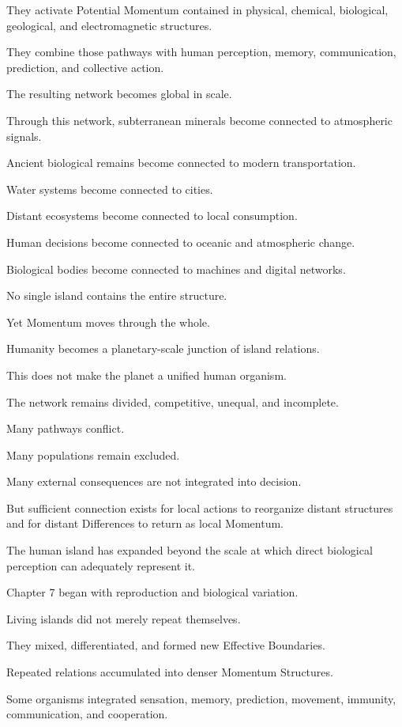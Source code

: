 They activate Potential Momentum contained in physical, chemical, biological, geological, and electromagnetic structures.

They combine those pathways with human perception, memory, communication, prediction, and collective action.

The resulting network becomes global in scale.

Through this network, subterranean minerals become connected to atmospheric signals.

Ancient biological remains become connected to modern transportation.

Water systems become connected to cities.

Distant ecosystems become connected to local consumption.

Human decisions become connected to oceanic and atmospheric change.

Biological bodies become connected to machines and digital networks.

No single island contains the entire structure.

Yet Momentum moves through the whole.

Humanity becomes a planetary-scale junction of island relations.

This does not make the planet a unified human organism.

The network remains divided, competitive, unequal, and incomplete.

Many pathways conflict.

Many populations remain excluded.

Many external consequences are not integrated into decision.

But sufficient connection exists for local actions to reorganize distant structures and for distant Differences to return as local Momentum.

The human island has expanded beyond the scale at which direct biological perception can adequately represent it.

Chapter 7 began with reproduction and biological variation.

Living islands did not merely repeat themselves.

They mixed, differentiated, and formed new Effective Boundaries.

Repeated relations accumulated into denser Momentum Structures.

Some organisms integrated sensation, memory, prediction, movement, immunity, communication, and cooperation.

